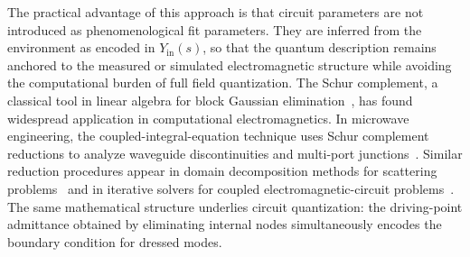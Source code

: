 \documentclass[reprint, floatfix, superscriptaddress, amsmath, amssymb, longbibliography]{revtex4-2}
\newcommand{\Yin}{Y_{\mathrm{in}}}
\begin{document}
The practical advantage of this approach is that circuit parameters are not introduced as phenomenological fit parameters. They are inferred from the environment as encoded in $\Yin(s)$, so that the quantum description remains anchored to the measured or simulated electromagnetic structure while avoiding the computational burden of full field quantization. The Schur complement, a classical tool in linear algebra for block Gaussian elimination~\cite{Zhang2005, Haynsworth1968}, has found widespread application in computational electromagnetics. In microwave engineering, the coupled-integral-equation technique uses Schur complement reductions to analyze waveguide discontinuities and multi-port junctions~\cite{Amari1996, Amari1999}. Similar reduction procedures appear in domain decomposition methods for scattering problems~\cite{Turc2017} and in iterative solvers for coupled electromagnetic-circuit problems~\cite{Chou2016}. The same mathematical structure underlies circuit quantization: the driving-point admittance obtained by eliminating internal nodes simultaneously encodes the boundary condition for dressed modes. 
\end{document}
